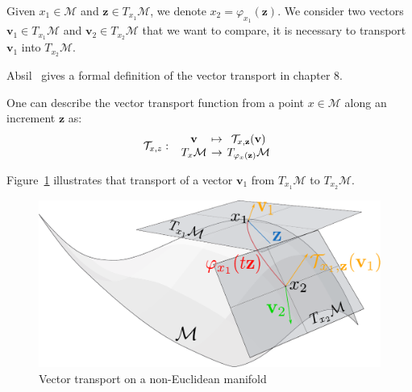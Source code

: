 Given $x_1\in\mathcal{M}$ and $\mathbf{z}\in T_{x_1}\mathcal{M}$, we denote $x_2=\varphi_{x_1}(\mathbf{z})$.
We consider two vectors $\mathbf{v}_1 \in T_{x_1}\mathcal{M}$ and $\mathbf{v}_2 \in T_{x_2}\mathcal{M}$ that we want to compare, it is necessary to transport $\mathbf{v}_1$ into $T_{x_2}\mathcal{M}$.

Absil~\cite{absil:book:2008} gives a formal definition of the vector transport in chapter 8.

One can describe the vector transport function from a point $x\in \mathcal{M}$ along an increment $\mathbf{z}$ as:
\begin{equation}
  \mathcal{T}_{x,z} :\
  \begin{array}{ccc}
    \mathbf{v} & \reduce{\mapsto}{6} & \mathcal{T}_{x,\mathbf{z}}(\mathbf{v}) \\
    T_x\mathcal{M} & \reduce{\rightarrow}{6} & T_{\varphi_x(\mathbf{z})}\mathcal{M}
  \end{array} \nonumber%
\end{equation}



Figure~\ref{fig:transport} illustrates that transport of a vector $\mathbf{v}_1$ from $T_{x_1}\mathcal{M}$ to $T_{x_2}\mathcal{M}$.

\begin{figure}[htpb]
  \centering
  \includegraphics[width=0.8\linewidth]{transport.pdf}
  \caption{Vector transport on a non-Euclidean manifold}
\label{fig:transport}
\end{figure}


